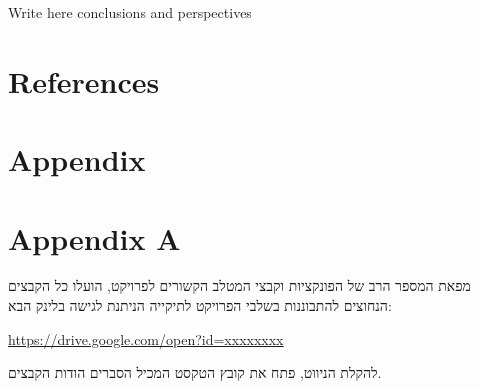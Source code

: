 \documentclass[12pt]{book}
\numberwithin{equation}{section}
\numberwithin{figure}{section}
\numberwithin{table}{section}
\begin{document}
Write here conclusions and perspectives

\newpage


\section*{\centering References}







\newpage

\renewcommand{\thepage}{A-\arabic{page}}
\setcounter{page}{1}
\section*{\centering Appendix}

\section*{Appendix A}

\begin{hebrew}
מפאת המספר הרב של הפונקציות וקבצי המטלב הקשורים לפרויקט, הועלו כל הקבצים הנחוצים להתבוננות בשלבי הפרויקט לתיקייה הניתנת לגישה בלינק הבא: 

\url{https://drive.google.com/open?id=xxxxxxxx}

להקלת הניווט, פתח את קובץ הטקסט המכיל הסברים הודות הקבצים.

\end{hebrew}
\end{document}
